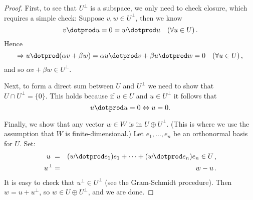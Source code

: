 \begin{proof}
First, to see that $U^\perp$ is a subspace, we only need to check closure, which requires a simple check:
Suppose $v,w\in U^\perp$, then we know  \[v\dotprod u = 0 = w\dotprod u \quad (\forall u\in U)\, .\]
Hence
\[\Rightarrow u\dotprod(\alpha v+\beta w)= \alpha u\dotprod v + \beta u\dotprod w =0\quad (\forall u\in U)\, ,\] 
and so $\alpha v+\beta w\in U^\perp$.

Next, to form a direct sum between $U$ and $U^\perp$ we need to show
that $U\cap U^\perp=\{0\}$. This holds because if $u\in U$ and $u\in U^\perp$ it follows that
\[
u\dotprod u = 0 \Leftrightarrow u=0.
\]

Finally, we show that any vector $w\in W$ is in $U\oplus U^\perp$.  (This is where we use the assumption that $W$ is finite-dimensional.)  Let $e_1, \ldots, e_n$ be an orthonormal basis for $U$.  Set: 
\begin{eqnarray*}
u\ &=&(w\dotprod e_1)e_1 + \cdots + (w\dotprod e_n)e_n \in U\, ,\\
u^\perp&=& w-u\, .
\end{eqnarray*}
It is easy to check that $u^\perp \in U^\perp$ (see the Gram-Schmidt procedure).  Then $w=u+u^\perp$, so $w\in U\oplus U^\perp$, and we are done.
\end{proof}



